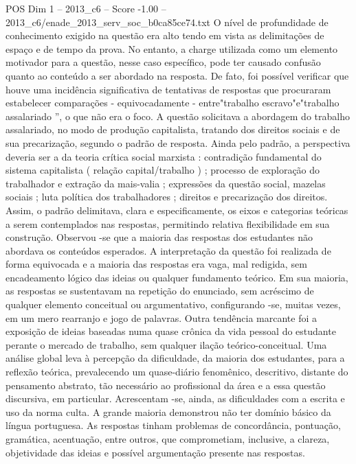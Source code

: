 \begin{textsample}{POS Dim 1 – 2013\_c6 – Score -1.00 – 2013\_c6/enade\_2013\_serv\_soc\_b0ca85ce74.txt}
O nível de profundidade de conhecimento exigido na questão era alto tendo em vista as delimitações de espaço e de tempo da prova.
No entanto, a charge utilizada como um elemento motivador para a questão, nesse caso específico, pode ter causado confusão quanto ao conteúdo a ser abordado na resposta.
De fato, foi possível verificar que houve uma incidência significativa de tentativas de respostas que procuraram estabelecer comparações - equivocadamente - entre"trabalho escravo"e"trabalho assalariado ”, o que não era o foco.
A questão solicitava a abordagem do trabalho assalariado, no modo de produção capitalista, tratando dos direitos sociais e de sua precarização, segundo o padrão de resposta.
Ainda pelo padrão, a perspectiva deveria ser a da teoria crítica social marxista : contradição fundamental do sistema capitalista ( relação capital/trabalho ) ; processo de exploração do trabalhador e extração da mais-valia ; expressões da questão social, mazelas sociais ; luta política dos trabalhadores ; direitos e precarização dos direitos.
Assim, o padrão delimitava, clara e especificamente, os eixos e categorias teóricas a serem contemplados nas respostas, permitindo relativa flexibilidade em sua construção.
Observou -se que a maioria das respostas dos estudantes não abordava os conteúdos esperados.
A interpretação da questão foi realizada de forma equivocada e a maioria das respostas era vaga, mal redigida, sem encadeamento lógico das ideias ou qualquer fundamento teórico.
Em sua maioria, as respostas se sustentavam na repetição do enunciado, sem acréscimo de qualquer elemento conceitual ou argumentativo, configurando -se, muitas vezes, em um mero rearranjo e jogo de palavras.
Outra tendência marcante foi a exposição de ideias baseadas numa quase crônica da vida pessoal do estudante perante o mercado de trabalho, sem qualquer ilação teórico-conceitual.
Uma análise global leva à percepção da dificuldade, da maioria dos estudantes, para a reflexão teórica, prevalecendo um quase-diário fenomênico, descritivo, distante do pensamento abstrato, tão necessário ao profissional da área e a essa questão discursiva, em particular.
Acrescentam -se, ainda, as dificuldades com a escrita e uso da norma culta.
A grande maioria demonstrou não ter domínio básico da língua portuguesa.
As respostas tinham problemas de concordância, pontuação, gramática, acentuação, entre outros, que comprometiam, inclusive, a clareza, objetividade das ideias e possível argumentação presente nas respostas.

\end{textsample}
